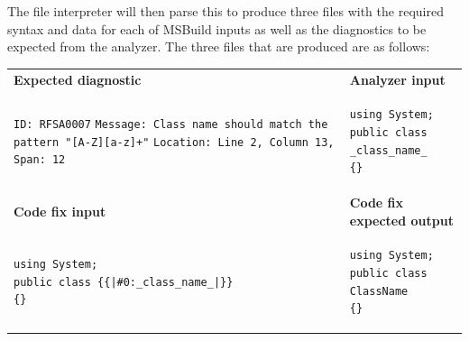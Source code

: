 The file interpreter will then parse this to produce three files with the required syntax and data for each of MSBuild inputs as well as the diagnostics to be expected from the analyzer. The three files that are produced are as follows:

\begin{table}[h!]
    \centering
    \begin{tabular}{p{9cm}p{8cm}}
        \textbf{Expected diagnostic} & \textbf{Analyzer input} \\
        \texttt{ID: RFSA0007}\newline
        \texttt{Message: Class name should match the pattern "[A-Z][a-z]+"}\newline
        \texttt{Location: Line 2, Column 13, Span: 12}
        &
        \begin{lstlisting}[style=sharpc]
using System;
public class _class_name_
{}
        \end{lstlisting}
        \\
        \textbf{Code fix input} & \textbf{Code fix expected output} \\
        \begin{lstlisting}[style=sharpc]
using System;
public class {{|#0:_class_name_|}}
{}
        \end{lstlisting}
        &
        \begin{lstlisting}[style=sharpc]
using System;
public class ClassName
{}
        \end{lstlisting}
        \\
    \end{tabular}
\end{table}


